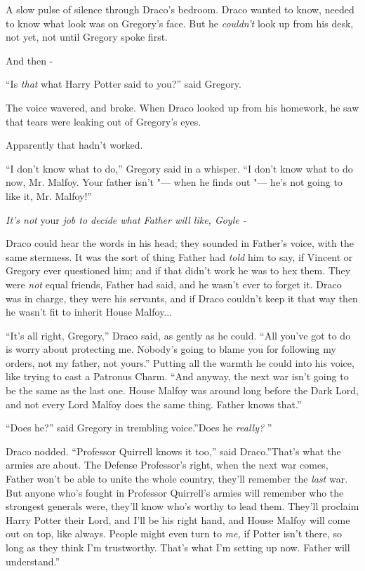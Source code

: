 A slow pulse of silence through Draco's bedroom. Draco wanted to know,
needed to know what look was on Gregory's face. But he \emph{couldn't}
look up from his desk, not yet, not until Gregory spoke first.

And then -

``Is \emph{that} what Harry Potter said to you?'' said Gregory.

The voice wavered, and broke. When Draco looked up from his homework, he
saw that tears were leaking out of Gregory's eyes.

Apparently that hadn't worked.

``I don't know what to do,'' Gregory said in a whisper. ``I don't know
what to do now, Mr. Malfoy. Your father isn't "--- when he finds out "--- he's
not going to like it, Mr. Malfoy!''

\emph{It's not} your \emph{job to decide what Father will like, Goyle -}

Draco could hear the words in his head; they sounded in Father's voice,
with the same sternness. It was the sort of thing Father had \emph{told}
him to say, if Vincent or Gregory ever questioned him; and if that
didn't work he was to hex them. They were \emph{not} equal friends,
Father had said, and he wasn't ever to forget it. Draco was in charge,
they were his servants, and if Draco couldn't keep it that way then he
wasn't fit to inherit House Malfoy...

``It's all right, Gregory,'' Draco said, as gently as he could. ``All
you've got to do is worry about protecting me. Nobody's going to blame
you for following my orders, not my father, not yours.'' Putting all the
warmth he could into his voice, like trying to cast a Patronus Charm.
``And anyway, the next war isn't going to be the same as the last one.
House Malfoy was around long before the Dark Lord, and not every Lord
Malfoy does the same thing. Father knows that.''

``Does he?'' said Gregory in trembling voice.''Does he \emph{really?} ''

Draco nodded. ``Professor Quirrell knows it too,'' said Draco.''That's
what the armies are about. The Defense Professor's right, when the next
war comes, Father won't be able to unite the whole country, they'll
remember the \emph{last} war. But anyone who's fought in Professor
Quirrell's armies will remember who the strongest generals were, they'll
know who's worthy to lead them. They'll proclaim Harry Potter their
Lord, and I'll be his right hand, and House Malfoy will come out on top,
like always. People might even turn to \emph{me,} if Potter isn't there,
so long as they think I'm trustworthy. That's what I'm setting up now.
Father will understand.''


